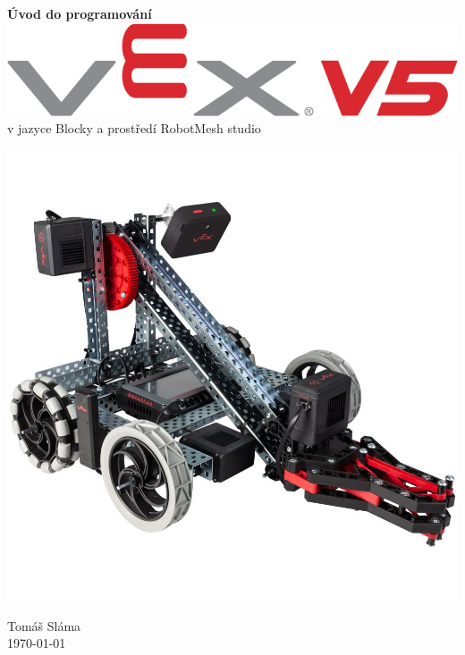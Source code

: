 \documentclass[11pt]{article}
\begin{document}
\begin{titlepage}
    \begin{center}
        \vspace*{3em}
        \Huge
				\textbf{Úvod do programování} \includegraphics[height=0.65\baselineskip]{Images/vex-logo.png}
				\\
				\Large
        \vspace*{0.5em}
				v jazyce Blocky a prostředí RobotMesh studio

        \vfill
				\includegraphics[width=0.7\linewidth]{Images/robot.jpg}
        \vfill

        \flushright
        \normalsize
				Tomáš Sláma\\
				\today
    \end{center}
\end{titlepage}

\tableofcontents
\clearpage

\newcommand{\block}{$\vcenter{\hbox{\texttt{[image: ../Images/blocky-logo.png]}}}$}
\newcommand{\centerimage}[2]{$\vcenter{\hbox{\texttt{[image: \#2]}}}$}
\end{document}
